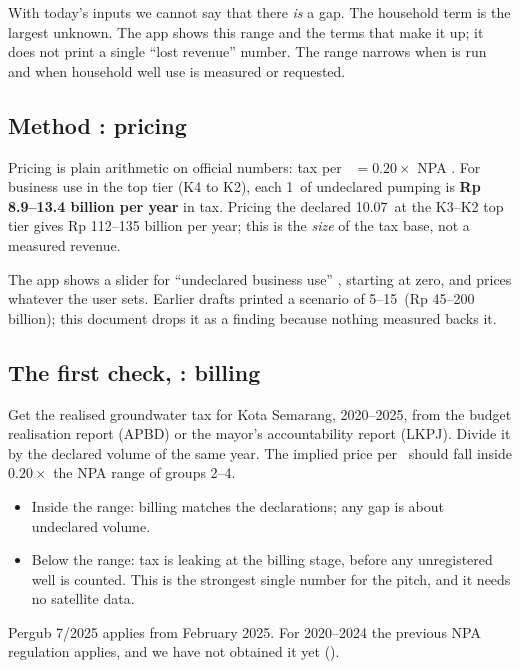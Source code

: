 \begin{caution}
With today's inputs we cannot say that there \emph{is} a gap. The household term is the largest unknown.
The app shows this range and the terms that make it up; it does not print a single ``lost revenue''
number. The range narrows when  is run and when household well use is measured or requested.
\end{caution}

\subsection{Method : pricing}

Pricing is plain arithmetic on official numbers: tax per \mthree\ $=0.20\times$ NPA \Calc. For business use in
the top tier (K4 to K2), each 1\Mm\ of undeclared pumping is \textbf{Rp 8.9--13.4 billion per year} in tax.
Pricing the declared 10.07\Mm\ at the K3--K2 top tier gives Rp 112--135 billion per year; this is the
\emph{size} of the tax base, not a measured revenue.

The app shows a slider for ``undeclared business use'' \Scn, starting at zero, and prices whatever the user
sets. Earlier drafts printed a scenario of 5--15\Mm\ (Rp 45--200 billion); this document drops it as a
finding because nothing measured backs it.

\subsection{The first check, : billing}\label{sec:v1}

Get the realised groundwater tax for Kota Semarang, 2020--2025, from the budget realisation report (APBD)
or the mayor's accountability report (LKPJ). Divide it by the declared volume of the same year. The
implied price per \mthree\ should fall inside $0.20\times$ the NPA range of groups 2--4.
\begin{itemize}
\item Inside the range: billing matches the declarations; any gap is about undeclared volume.
\item Below the range: tax is leaking at the billing stage, before any unregistered well is counted. This is
  the strongest single number for the pitch, and it needs no satellite data.
\end{itemize}

\begin{caution}
Pergub 7/2025 applies from February 2025. For 2020--2024 the previous NPA regulation applies, and we have
not obtained it yet ().
\end{caution}
